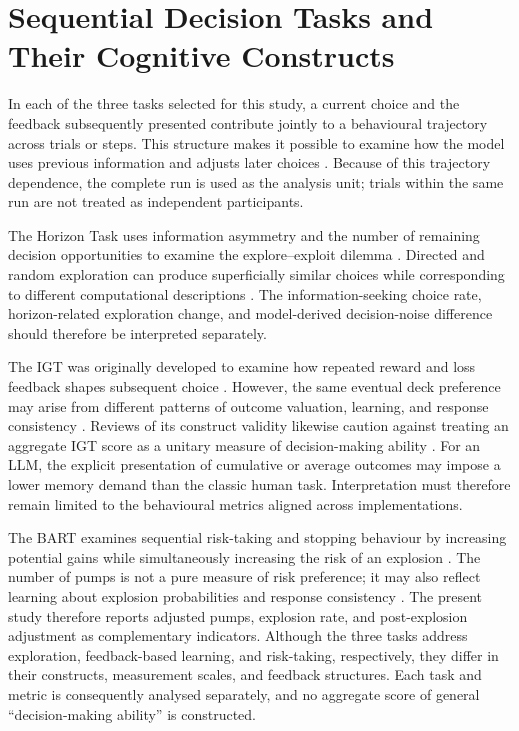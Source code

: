 \documentclass[logo,msc]{infthesis}
\begin{document}
\section{Sequential Decision Tasks and Their Cognitive Constructs}

In each of the three tasks selected for this study, a current choice and the feedback subsequently presented contribute jointly to a behavioural trajectory across trials or steps. This structure makes it possible to examine how the model uses previous information and adjusts later choices \cite{Wilson2014,Bechara1994,Lejuez2002,Loya2023PromptSensitivityDecision}. Because of this trajectory dependence, the complete run is used as the analysis unit; trials within the same run are not treated as independent participants.

The Horizon Task uses information asymmetry and the number of remaining decision opportunities to examine the explore--exploit dilemma \cite{Wilson2014}. Directed and random exploration can produce superficially similar choices while corresponding to different computational descriptions \cite{Gershman2018Exploration}. The information-seeking choice rate, horizon-related exploration change, and model-derived decision-noise difference should therefore be interpreted separately.

The IGT was originally developed to examine how repeated reward and loss feedback shapes subsequent choice \cite{Bechara1994}. However, the same eventual deck preference may arise from different patterns of outcome valuation, learning, and response consistency \cite{Busemeyer2002PVL,Steingroever2013PVLDelta}. Reviews of its construct validity likewise caution against treating an aggregate IGT score as a unitary measure of decision-making ability \cite{Buelow2009IGTValidity}. For an LLM, the explicit presentation of cumulative or average outcomes may impose a lower memory demand than the classic human task. Interpretation must therefore remain limited to the behavioural metrics aligned across implementations.

The BART examines sequential risk-taking and stopping behaviour by increasing potential gains while simultaneously increasing the risk of an explosion \cite{Lejuez2002}. The number of pumps is not a pure measure of risk preference; it may also reflect learning about explosion probabilities and response consistency \cite{Wallsten2005BARTModel,VanRavenzwaaij2011BART}. The present study therefore reports adjusted pumps, explosion rate, and post-explosion adjustment as complementary indicators. Although the three tasks address exploration, feedback-based learning, and risk-taking, respectively, they differ in their constructs, measurement scales, and feedback structures. Each task and metric is consequently analysed separately, and no aggregate score of general ``decision-making ability'' is constructed.
\end{document}
